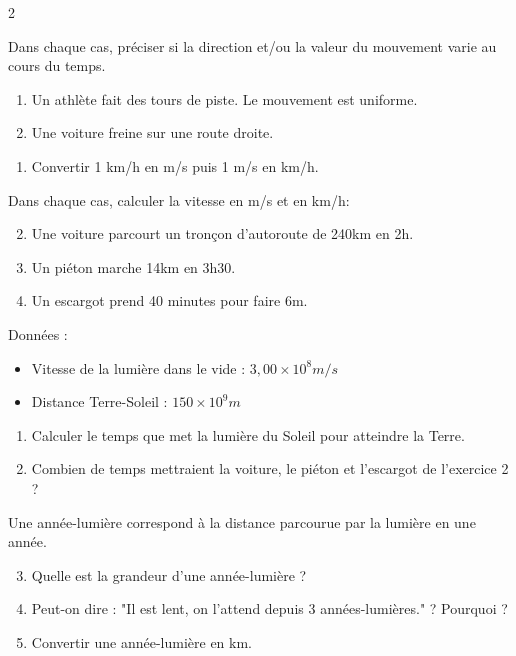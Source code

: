 \documentclass[11pt,a5paper,landscape]{article}
\begin{document}
\begin{multicols*}{2}


Dans chaque cas, préciser si la direction et/ou la valeur du mouvement varie au cours du temps.
\begin{enumerate}
    \item Un athlète fait des tours de piste. Le mouvement est uniforme.
    \item Une voiture freine sur une route droite.
\end{enumerate}


\begin{enumerate}
    \item Convertir 1 km/h en m/s puis 1 m/s en km/h.
\end{enumerate}
Dans chaque cas, calculer la vitesse en m/s et en km/h:
\begin{enumerate}
    \setcounter{enumi}{1}
    \item Une voiture parcourt un tronçon d’autoroute de 240km en 2h.
    \item Un piéton marche 14km en 3h30.
    \item Un escargot prend 40 minutes pour faire 6m.
\end{enumerate}


Données :
\begin{itemize}
    \item Vitesse de la lumière dans le vide : $3,00\times10^8 m/s$
    \item Distance Terre-Soleil : $150\times10^9m$
\end{itemize}

\begin{enumerate}
    \item Calculer le temps que met la lumière du Soleil pour atteindre la Terre.
    \item Combien de temps mettraient la voiture, le piéton et l'escargot de l'exercice 2 ?
\end{enumerate}
Une année-lumière correspond à la distance parcourue par la lumière en une année.
\begin{enumerate}
    \setcounter{enumi}{2}
    \item Quelle est la grandeur d'une année-lumière ?
    \item Peut-on dire : "Il est lent, on l'attend depuis 3 années-lumières." ? Pourquoi ?
    \item Convertir une année-lumière en km.
\end{enumerate}


\end{multicols*}
\end{document}
